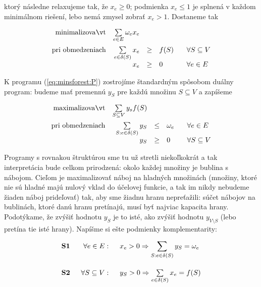 \noindent ktorý následne relaxujeme tak, že $x_e\ge0$; podmienka $x_e\le1$ je splnená v každom minimálnom riešení,
lebo nemá zmysel zobrať $x_e>1$. Dostaneme tak

\begin{equation}
  \label{eq:minsforest:P}
\begin{array}{rrcll}
  {\rm minimalizovať}     & \multicolumn{1}{l}{\sum\limits_{e\in E}\omega_ex_e}\\[3ex]
  {\rm pri\ obmedzeniach} & \sum\limits_{e\in\delta(S)}x_e&\ge&f(S)& \;\;\;\forall S\subseteq V\\
                          & x_e &\ge&0& \;\;\;\forall e\in E\\
\end{array}
\end{equation}

\noindent
K programu (\ref{eq:minsforest:P}) zostrojíme štandardným spôsobom duálny program: budeme mať premennú $y_S$ 
pre každú množinu $S\subseteq V$ a zapíšeme

\begin{equation}
  \label{eq:minsforest:D}
\begin{array}{rrcll}
  {\rm maximalizovať}     & \multicolumn{1}{l}{\sum\limits_{S\subseteq V}y_sf(S)}\\[3ex]
  {\rm pri\ obmedzeniach} & \sum\limits_{S:e\in\delta(S)}y_S&\le&\omega_e& \;\;\;\forall e\in E\\
                          & y_S &\ge&0& \;\;\;\forall S\subseteq V\\
\end{array}
\end{equation}

\noindent
Programy s rovnakou štruktúrou sme tu už stretli niekoľkokrát a tak interpretácia bude celkom prirodzená:
okolo každej množiny je bublina s nábojom. Cieľom je maximalizovať náboj na hladných množinách 
(množiny, ktoré nie sú hladné majú nulový vklad do účelovej funkcie, a tak im nikdy nebudeme žiaden náboj prideľovať)
tak, aby sme žiadnu hranu nepreťažili: súčet nábojov na bublinách, ktoré danú hranu pretínajú, musí byť najviac
kapacita hrany. Podotýkame, že zvýšiť hodnotu $y_S$ je to isté, ako zvýšiť hodnotu
$y_{V\setminus S}$ (lebo pretína tie isté hrany). Napíšme si ešte podmienky komplementarity:

$$\begin{array}{lrl}
  {\bf S1} \;\;&\forall e\in E:\;\;&x_e>0\Rightarrow
  \displaystyle\sum\limits_{S:e\in\delta(S)}y_S=\omega_e\\[6ex]
  {\bf S2} \;\;&\forall S\subseteq V:\;\; & y_S>0\Rightarrow \sum\limits_{e\in\delta(S)}x_e=f(S)
\end{array}$$

